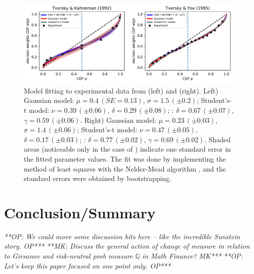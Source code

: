 \documentclass[a4paper, 12pt]{article}
\newcommand{\flabel}[1]{\label{fig:#1}}
\newcommand{\MK}[1]{{\it ***MK: #1 MK***}}
\newcommand{\OP}[1]{{\it ***OP: #1 OP***}}
\begin{document}
\begin{figure}[htb]
\centering
\includegraphics[width=1.0\textwidth]{./figs/TK_TF_fit.pdf}
\caption{Model fitting to experimental data from \cite{TverskyKahneman1992} (left) and \cite{TverskyFox1995} (right).
Left) Gaussian model: $\mu=0.4\,\left(SE = 0.13\right)$, $\sigma=1.5\,\left(\pm0.2\right)$; Student's-t model: $\nu=0.39\,\left(\pm0.06\right)$, $\delta=0.29\,\left(\pm0.08\right)$; \cite{LattimoreBakerWitte1992}: $\delta=0.67\,\left(\pm0.07\right)$, $\gamma=0.59\,\left(\pm0.06\right)$. Right) Gaussian model: $\mu=0.23\,\left(\pm0.03\right)$, $\sigma=1.4\,\left(\pm0.06\right)$; Student's-t model: $\nu=0.47\,\left(\pm0.05\right)$, $\delta=0.17\,\left(\pm0.03\right)$; \cite{LattimoreBakerWitte1992}: $\delta=0.77\,\left(\pm0.02\right)$, $\gamma=0.69\,\left(\pm0.02\right)$. Shaded areas (noticeable only in the case of \cite{TverskyKahneman1992}) indicate one standard error in the fitted parameter values. The fit was done by implementing the method of least squares with the Nelder-Mead algorithm \cite{NelderMead1965}, and the standard errors were obtained by bootstrapping.}
\flabel{TK_TF_fit}
\end{figure}

\FloatBarrier
\section{Conclusion/Summary}
\OP{We could move some discussion bits here -- like the incredible Sunstein story.}
\MK{Discuss the general action of change of measure in relation to Girsanov and risk-neutral prob measure $\mathbb{Q}$ in Math Finance?}
\OP{Let's keep this paper focused on one point only.}




\end{document}
